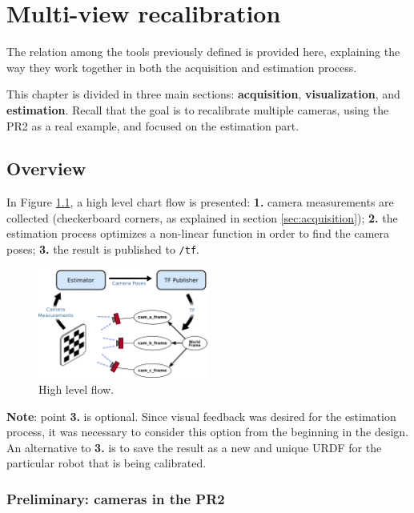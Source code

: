 \chapter{Multi-view recalibration}
\label{cha:multi-view calibration}

\vspace*{-3ex}
The relation among the tools previously defined is provided here, explaining the way they work together in both the acquisition and estimation process.

This chapter is divided in three main sections: \textbf{acquisition}, \textbf{visualization}, and \textbf{estimation}. Recall that the goal is to recalibrate multiple cameras, using the PR2 as a real example, and focused on the estimation part.

\section{Overview}
\label{sec:estimation_overview}

In Figure \ref{fig:high_level_flow}, a high level chart flow is presented: \textbf{1.} camera measurements are collected (checkerboard corners, as explained in section \ref{sec:acquisition}); \textbf{2.} the estimation process optimizes a non-linear function in order to find the camera poses; \textbf{3.} the result is published to \texttt{/tf}.

\begin{figure}[!htbp]
 \centering
 \includegraphics[width=0.5\textwidth]{images/high_level_flow_02.png}
 \caption{High level flow.}
 \label{fig:high_level_flow}
\end{figure}

\noindent
\textbf{Note}: point \textbf{3.} is optional. Since visual feedback was desired for the estimation process, it was necessary to consider this option from the beginning in the design. An alternative to \textbf{3.} is to save the result as a new and unique URDF for the particular robot that is being calibrated.



\subsection*{Preliminary: cameras in the PR2}

